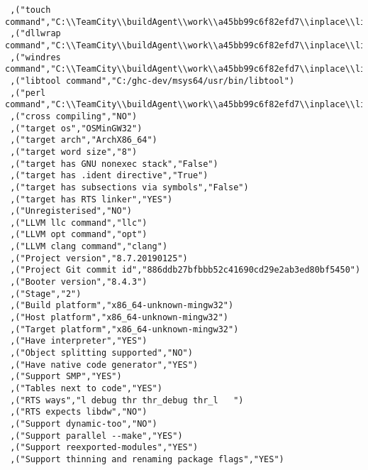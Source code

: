 \begin{verbatim}
 ,("touch command","C:\\TeamCity\\buildAgent\\work\\a45bb99c6f82efd7\\inplace\\lib/bin/touchy.exe")
 ,("dllwrap command","C:\\TeamCity\\buildAgent\\work\\a45bb99c6f82efd7\\inplace\\lib\\../mingw/bin/dllwrap.exe")
 ,("windres command","C:\\TeamCity\\buildAgent\\work\\a45bb99c6f82efd7\\inplace\\lib\\../mingw/bin/windres.exe")
 ,("libtool command","C:/ghc-dev/msys64/usr/bin/libtool")
 ,("perl command","C:\\TeamCity\\buildAgent\\work\\a45bb99c6f82efd7\\inplace\\lib\\../perl/perl.exe")
 ,("cross compiling","NO")
 ,("target os","OSMinGW32")
 ,("target arch","ArchX86_64")
 ,("target word size","8")
 ,("target has GNU nonexec stack","False")
 ,("target has .ident directive","True")
 ,("target has subsections via symbols","False")
 ,("target has RTS linker","YES")
 ,("Unregisterised","NO")
 ,("LLVM llc command","llc")
 ,("LLVM opt command","opt")
 ,("LLVM clang command","clang")
 ,("Project version","8.7.20190125")
 ,("Project Git commit id","886ddb27bfbbb52c41690cd29e2ab3ed80bf5450")
 ,("Booter version","8.4.3")
 ,("Stage","2")
 ,("Build platform","x86_64-unknown-mingw32")
 ,("Host platform","x86_64-unknown-mingw32")
 ,("Target platform","x86_64-unknown-mingw32")
 ,("Have interpreter","YES")
 ,("Object splitting supported","NO")
 ,("Have native code generator","YES")
 ,("Support SMP","YES")
 ,("Tables next to code","YES")
 ,("RTS ways","l debug thr thr_debug thr_l   ")
 ,("RTS expects libdw","NO")
 ,("Support dynamic-too","NO")
 ,("Support parallel --make","YES")
 ,("Support reexported-modules","YES")
 ,("Support thinning and renaming package flags","YES")

\end{verbatim}
